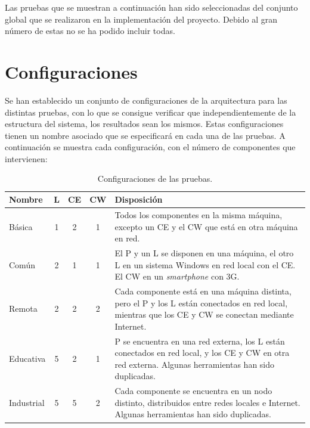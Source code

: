 


Las pruebas que se muestran a continuación han sido seleccionadas del 
conjunto global que se realizaron en la implementación del proyecto. 
Debido al gran número de estas no se ha podido incluir todas.

\section{Configuraciones}
Se han establecido un conjunto de configuraciones de la arquitectura 
para las distintas pruebas, con lo que se consigue verificar que 
independientemente de la estructura del sistema, los resultados sean 
los mismos. Estas configuraciones tienen un nombre asociado que se 
especificará en cada una de las pruebas. A continuación se muestra 
cada configuración, con el número de componentes que intervienen:

\begin{table}[H]
\begin{center}
\begin{tabular}{|| l | c | c | c | p{10cm} ||}
	\hline
	\hline
	Nombre & L & CE & CW & Disposición\\
	\hline
	\hline
	Básica & 1 & 2 & 1 & Todos los componentes en la misma máquina, 
	excepto un CE y el CW que está en otra máquina en red.\\
	\hline
	Común & 2 & 1 & 1 & El P y un L se disponen en 
	una máquina, el otro L en un sistema Windows en red 
	local con el CE. El CW en un \emph{smartphone} con 3G.\\
	\hline
	Remota & 2 & 2 & 2 & Cada componente está en una máquina distinta, 
	pero el P y los L están conectados en red local, mientras que los 
	CE y CW se conectan mediante Internet.\\
	\hline
	Educativa & 5 & 2 & 1 & P se encuentra en una red externa, los L 
	están conectados en red local, y los CE y CW en otra red externa. Algunas 
	herramientas han sido duplicadas.\\
	\hline
	Industrial & 5 & 5 & 2 & Cada componente se encuentra en un nodo 
	distinto, distribuidos entre redes locales e Internet. Algunas 
	herramientas han sido duplicadas.\\
	\hline
	\hline
\end{tabular}
\end{center}
	\caption{Configuraciones de las pruebas.}
	\label{tab:configuraciones}
\end{table}

